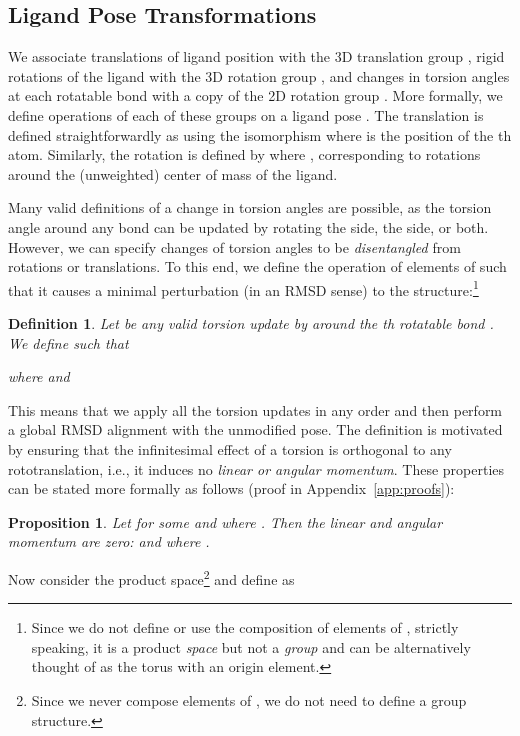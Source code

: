 \documentclass{article} \usepackage{iclr2023_conference,times}
\begin{document}
\subsection{Ligand Pose Transformations}


We associate translations of ligand position with the 3D translation group , rigid rotations of the ligand with the 3D rotation group , and changes in torsion angles at each rotatable bond with a copy of the 2D rotation group . More formally, we define operations of each of these groups on a ligand pose . The translation  is defined straightforwardly as  using the isomorphism  where  is the position of the th atom. Similarly, the rotation  is defined by  where , corresponding to rotations around the (unweighted) center of mass of the ligand.

Many valid definitions of a change in torsion angles are possible, as the torsion angle around any bond  can be updated by rotating the  side, the  side, or both. However, we can specify changes of torsion angles to be \emph{disentangled} from rotations or translations. To this end, we define the operation of elements of  such that it causes a minimal perturbation (in an RMSD sense) to the structure:\footnote{Since we do not define or use the composition of elements of , strictly speaking, it is a product \emph{space} but not a \emph{group} and can be alternatively thought of as the torus  with an origin element.}
\newtheorem*{definition*}{Definition}
\begin{definition*}
Let  be any valid torsion update by  around the th rotatable bond . We define such that

where  and

\end{definition*}
This means that we apply all the  torsion updates in any order and then perform a global RMSD alignment with the unmodified pose. The definition is motivated by ensuring that the infinitesimal effect of a torsion is orthogonal to any rototranslation, i.e., it induces no \emph{linear or angular momentum}. These properties can be stated more formally as follows (proof in Appendix~\ref{app:proofs}):

\newtheorem{proposition}{Proposition}
\begin{proposition}
Let  for some  and where . Then the linear and angular momentum are zero:  and  where .
\end{proposition}

Now consider the product space\footnote{Since we never compose elements of , we do not need to define a group structure.}  and define  as
\end{document}
